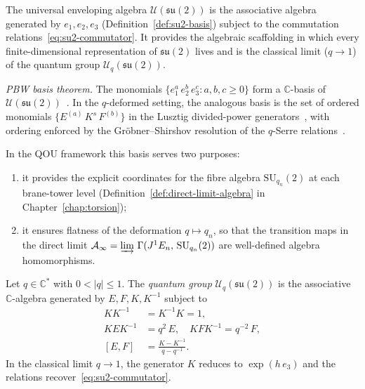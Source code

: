 \begin{remark}
\label{rem:enveloping-algebra}
The universal enveloping algebra
$\mathcal{U}(\mathfrak{su}(2))$ is the associative algebra generated by
$e_1,e_2,e_3$ (Definition~\ref{def:su2-basis}) subject to the
commutation relations~\eqref{eq:su2-commutator}.  It provides the
algebraic scaffolding in which every finite-dimensional representation of
$\mathfrak{su}(2)$ lives and is the classical limit ($q\to 1$) of the
quantum group $\mathcal{U}_q(\mathfrak{su}(2))$.

\emph{PBW basis theorem.}
The monomials $\{e_1^{a}\,e_2^{b}\,e_3^{c} : a,b,c \geq 0\}$ form a
$\mathbb{C}$-basis of
$\mathcal{U}(\mathfrak{su}(2))$~\cite{lusztig1993}.
In the $q$-deformed setting, the analogous basis is the set of ordered
monomials $\{E^{(a)}\,K^{s}\,F^{(b)}\}$ in the Lusztig divided-power
generators~\cite{lusztig1993}, with ordering enforced by the
Gr\"obner--Shirshov resolution of the $q$-Serre
relations~\cite{fred2005}.

In the QOU framework this basis serves two purposes:
\begin{enumerate}
  \item it provides the explicit coordinates for the fibre algebra
        $\mathrm{SU}_{q_n}(2)$ at each brane-tower level
        (Definition~\ref{def:direct-limit-algebra} in
        Chapter~\ref{chap:torsion});
  \item it ensures flatness of the deformation $q \mapsto q_n$, so that
        the transition maps in the direct limit
        $\mathcal{A}_\infty = \varinjlim\,\Gamma(J^1 E_n,\,
        \mathrm{SU}_{q_n}(2))$ are well-defined algebra homomorphisms.
\end{enumerate}
\end{remark}

\begin{definition}
\label{def:quantum-su2}
Let $q\in\mathbb{C}^{*}$ with $0<\lvert q\rvert\le 1$.  The
\emph{quantum group} $\mathcal{U}_q(\mathfrak{su}(2))$ is the
associative $\mathbb{C}$-algebra generated by $E,F,K,K^{-1}$ subject to
\begin{align}
  KK^{-1}&=K^{-1}K=1,
    \label{eq:quantum-KK}\\[3pt]
  KEK^{-1}&=q^2\,E,\quad KFK^{-1}=q^{-2}\,F,
    \label{eq:quantum-KE}\\[3pt]
  [E,F]&=\frac{K-K^{-1}}{q-q^{-1}}.
    \label{eq:quantum-EF}
\end{align}
In the classical limit $q\to 1$, the generator $K$ reduces to
$\exp(h\,e_3)$ and the relations recover~\eqref{eq:su2-commutator}.
\end{definition}

